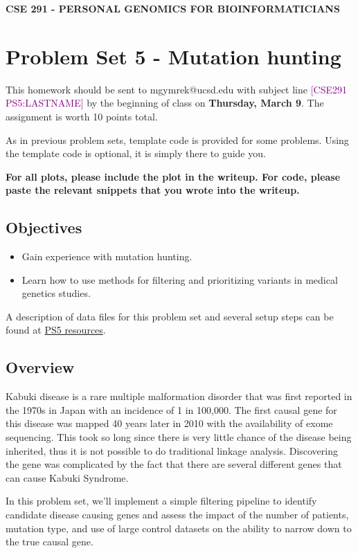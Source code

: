 \documentclass[12pt]{article}
\begin{document}
\textbf{CSE 291 - PERSONAL GENOMICS FOR BIOINFORMATICIANS}

\section*{Problem Set 5 - Mutation hunting}

This homework should be sent to mgymrek@ucsd.edu with subject line \textcolor{purple}{[CSE291 PS5:LASTNAME]} by the beginning of class on \textbf{Thursday, March 9}. The assignment is worth 10 points total.

As in previous problem sets, template code is provided for some problems. Using the template code is optional, it is simply there to guide you.

\textbf{For all plots, please include the plot in the writeup. For code, please paste the relevant snippets that you wrote into the writeup.}

\subsection*{Objectives}
\begin{itemize}
\item Gain experience with mutation hunting.
\item Learn how to use methods for filtering and prioritizing variants in medical genetics studies.
\end{itemize}

A description of data files for this problem set and several setup steps can be found at \href{https://gymreklab.github.io/teaching/personal\_genomics/ps5\_resources.html}{PS5 resources}. 

\subsection*{Overview}

Kabuki disease is a rare multiple malformation disorder that was first reported in the 1970s in Japan with an incidence of 1 in 100,000. The first causal gene for this disease was mapped 40 years later in 2010 with the availability of exome sequencing. This took so long since there is very little chance of the disease being inherited, thus it is not possible to do traditional linkage analysis. Discovering the gene was complicated by the fact that there are several different genes that can cause Kabuki Syndrome.

In this problem set, we'll implement a simple filtering pipeline to identify candidate disease causing genes and assess the impact of the number of patients, mutation type, and use of large control datasets on the ability to narrow down to the true causal gene.
\end{document}
